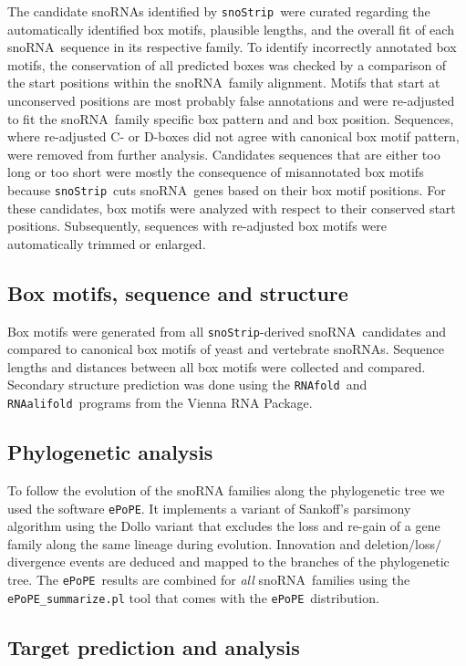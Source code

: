 \documentclass[preprint,3p,times,twocolumn]{elsarticle}
\newcommand{\PFS}[1]{\begingroup\color{blue}#1\endgroup}
\newcommand{\sno}{snoRNA}
\newcommand{\snostrip}{\texttt{snoStrip}}
\newcommand{\epope}{\texttt{ePoPE}}
\newcommand{\fold}{\texttt{RNAfold}}
\newcommand{\alifold}{\texttt{RNAalifold}}
\begin{document}
The candidate snoRNAs identified by \snostrip\ were curated regarding the
automatically identified box motifs, plausible lengths, and the overall fit
of each \sno\ sequence in its respective family. To identify incorrectly
annotated box motifs, the conservation of all predicted boxes was checked
by a comparison of the start positions within the \sno\ family
alignment. Motifs that start at unconserved positions are most probably
false annotations and were re-adjusted to fit the \sno\ family specific box
pattern and and box position.  Sequences, where re-adjusted C- or D-boxes
did not agree with canonical box motif pattern, were removed from further
analysis.
\PFS{Candidates sequences that are either too long or too short were mostly
  the consequence of} misannotated box motifs because \snostrip\ cuts \sno\
genes based on their box motif positions. For these candidates, box motifs
were analyzed with respect to their conserved start positions.
Subsequently, sequences with re-adjusted box motifs were automatically
trimmed or enlarged.

\subsection{Box motifs, sequence and structure}

Box motifs were generated from all \snostrip-derived \sno\ candidates
and compared to canonical box motifs of yeast and vertebrate snoRNAs.
Sequence lengths and distances between all box motifs were collected
and compared. Secondary structure prediction was done using the \fold\
and \alifold\ programs from the Vienna RNA
Package\cite{Hofacker:1994}.

\subsection{Phylogenetic analysis}

To follow the evolution of the snoRNA families along the phylogenetic
tree we used the software \epope\cite{Hertel:2015}.  It implements a
variant of Sankoff’s parsimony algorithm using the Dollo variant that
excludes the loss and re-gain of a gene family along the same lineage
during evolution.  Innovation and deletion$/$loss$/$divergence events
are deduced and mapped to the branches of the phylogenetic tree.  The
\epope\ results are combined for \emph{all} \sno\ families using the
\texttt{ePoPE\_summarize.pl} tool that comes with the \epope\
distribution.

\subsection{Target prediction and analysis}
\end{document}
